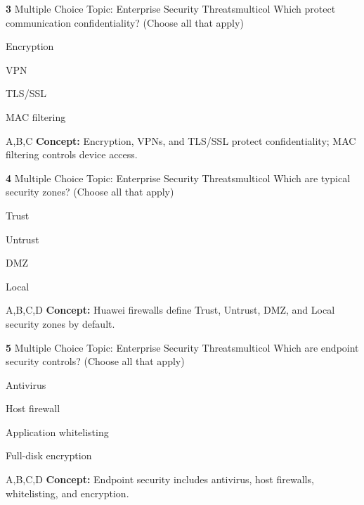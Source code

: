 \documentclass[10pt,a4paper]{article}
\begin{document}
\begin{qcard}{\color{white}\textbf{3} \hfill \small Multiple Choice \textbar{} Topic: Enterprise Security Threats}{multicol}
Which protect communication confidentiality? (Choose all that apply)

\begin{qoptions}
\item Encryption
\item VPN
\item TLS/SSL
\item MAC filtering
\end{qoptions}
\begin{explainbox}{A,B,C}
\textbf{Concept:} Encryption, VPNs, and TLS/SSL protect confidentiality; MAC filtering controls device access.
\end{explainbox}
\end{qcard}

\begin{qcard}{\color{white}\textbf{4} \hfill \small Multiple Choice \textbar{} Topic: Enterprise Security Threats}{multicol}
Which are typical security zones? (Choose all that apply)

\begin{qoptions}
\item Trust
\item Untrust
\item DMZ
\item Local
\end{qoptions}
\begin{explainbox}{A,B,C,D}
\textbf{Concept:} Huawei firewalls define Trust, Untrust, DMZ, and Local security zones by default.
\end{explainbox}
\end{qcard}

\begin{qcard}{\color{white}\textbf{5} \hfill \small Multiple Choice \textbar{} Topic: Enterprise Security Threats}{multicol}
Which are endpoint security controls? (Choose all that apply)

\begin{qoptions}
\item Antivirus
\item Host firewall
\item Application whitelisting
\item Full-disk encryption
\end{qoptions}
\begin{explainbox}{A,B,C,D}
\textbf{Concept:} Endpoint security includes antivirus, host firewalls, whitelisting, and encryption.
\end{explainbox}
\end{qcard}
\end{document}
